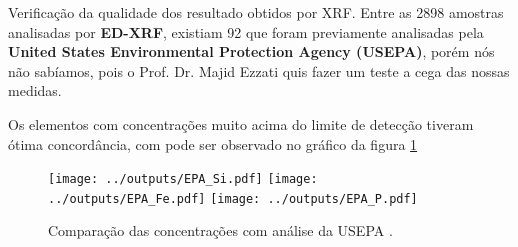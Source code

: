 Verificação da qualidade dos resultado obtidos por XRF.
Entre as 2898 amostras analisadas por \textbf{ED-XRF}, existiam 92 que foram 
previamente analisadas pela \textbf{United States Environmental Protection 
Agency (USEPA)}, porém nós não sabíamos, pois o Prof. Dr. Majid Ezzati quis 
fazer um teste a cega das nossas medidas. 

Os elementos com concentrações muito acima do limite de detecção tiveram ótima
concordância, com pode ser observado no gráfico da figura \ref{fig:epa} 

\begin{figure}[H]
  \centering
    \texttt{[image: ../outputs/EPA\_Si.pdf]}
    \texttt{[image: ../outputs/EPA\_Fe.pdf]}
    \texttt{[image: ../outputs/EPA\_P.pdf]}
  \caption{Comparação das concentrações com análise da USEPA \label{fig:epa}.}
\end{figure}
